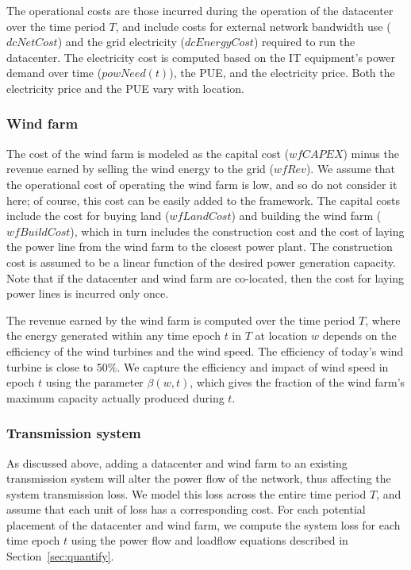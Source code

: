 The operational costs are those incurred during the operation of the datacenter over the time period $T$, and include costs for external network bandwidth use ($dcNetCost$) and the grid electricity ($dcEnergyCost$) required to run the datacenter.
The electricity cost is computed based on the IT equipment's power demand over time ($powNeed(t)$), the PUE, and the electricity price.  Both the electricity price and the PUE vary with location.


\subsubsection{Wind farm}  The cost of the wind farm is modeled as the capital cost ($wfCAPEX$) minus the revenue earned by selling the wind energy to the grid ($wfRev$).  We assume that the operational cost of operating the wind farm is low, and so do not consider it here; of course, this cost can be easily added to the framework.  The capital costs include the cost for buying land ($wfLandCost$) and building the wind farm ($wfBuildCost$), which in turn includes the construction cost and the cost of laying the power line from the wind farm to the closest power plant.  The construction cost is assumed to be a linear function of the desired power generation capacity.  Note that if the datacenter and wind farm are co-located, then the cost for laying power lines is incurred only once.

The revenue earned by the wind farm is computed over the time period $T$, where the energy generated within any time epoch $t$ in $T$ at location $w$ depends on the efficiency of the wind turbines and the wind speed.  The efficiency of today's wind turbine is close to 50\%.  We capture the efficiency and impact of wind speed in epoch $t$ using the parameter $\beta(w,t)$, which gives the fraction of the wind farm's maximum capacity actually produced during $t$.

\subsubsection{Transmission system} As discussed above, adding a datacenter and wind farm to an existing transmission system will alter the power flow of the network, thus affecting the system transmission loss.  We model this loss across the entire time period $T$, and assume that each unit of loss has a corresponding cost.  For each potential placement of the datacenter and wind farm, we compute the system loss for each time epoch $t$ using the power flow and loadflow equations described in Section~\ref{sec:quantify}.

